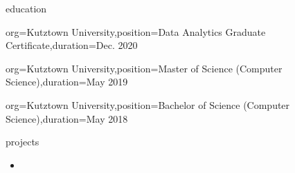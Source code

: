 \documentclass{resume}
\begin{document}
\begin{ResumeSection}{education}
    \begin{ResumeSubsection}{org={Kutztown University},position={Data Analytics Graduate Certificate},duration={Dec. 2020}}
    \end{ResumeSubsection}
    \begin{ResumeSubsection}{org={Kutztown University},position={Master of Science (Computer Science)},duration={May 2019}}        
    \end{ResumeSubsection}
    \begin{ResumeSubsection}{org={Kutztown University},position={Bachelor of Science (Computer Science)},duration={May 2018}}
    \end{ResumeSubsection}
\end{ResumeSection}

\begin{ResumeSection}{projects}
    \begin{itemize}
        \item \lipsum[1][1-2]
    \end{itemize}
\end{ResumeSection}
\end{document}

